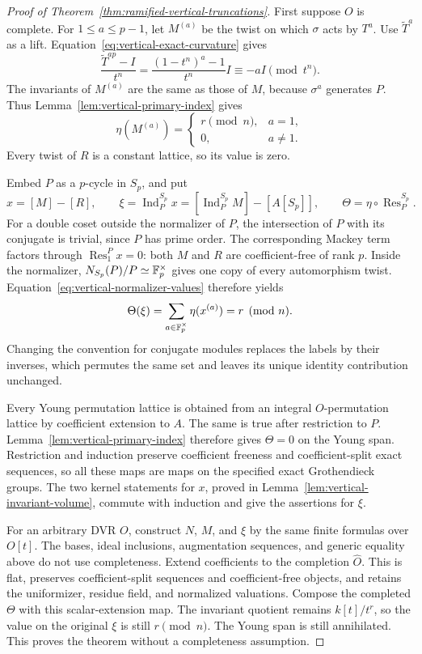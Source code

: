 \begin{proof}[Proof of Theorem~\ref{thm:ramified-vertical-truncations}]
First suppose \(O\) is complete.
For \(1\le a\le p-1\), let \(M^{(a)}\) be the twist on which
\(\sigma\) acts by \(T^a\).  Use \(\widetilde T^a\) as a lift.
Equation~\eqref{eq:vertical-exact-curvature} gives
\[
 \frac{\widetilde T^{ap}-I}{t^n}
 =\frac{(1-t^n)^a-1}{t^n}I
 \equiv -aI\pmod{t^n}.
\]
The invariants of \(M^{(a)}\) are the same as those of \(M\),
because \(\sigma^a\) generates \(P\).  Thus
Lemma~\ref{lem:vertical-primary-index} gives
\begin{equation}\label{eq:vertical-normalizer-values}
 \eta(M^{(a)})=
 \begin{cases}
 r\pmod n,&a=1,\\
 0,&a\ne1.
 \end{cases}
\end{equation}
Every twist of \(R\) is a constant lattice, so its value is zero.

Embed \(P\) as a \(p\)-cycle in \(S_p\), and put
\[
 x=[M]-[R],\qquad
 \xi=\operatorname{Ind}_{P}^{S_p}x
     =[\operatorname{Ind}_{P}^{S_p}M]-[A[S_p]],
 \qquad
 \Theta=\eta\circ\operatorname{Res}_{P}^{S_p}.
\]
For a double coset outside the normalizer of \(P\), the
intersection of \(P\) with its conjugate is trivial, since
\(P\) has prime order.
The corresponding Mackey term factors through
\(\operatorname{Res}_{1}^{P}x=0\): both \(M\) and \(R\)
are coefficient-free of rank \(p\).
Inside the normalizer, \(N_{S_p}(P)/P\simeq\mathbb F_p^\times\)
gives one copy of every automorphism twist.
Equation~\eqref{eq:vertical-normalizer-values} therefore yields
\[
 \Theta(\xi)=
 \sum_{a\in\mathbb F_p^\times}\eta(x^{(a)})
 =r\pmod n.
\]
Changing the convention for conjugate modules replaces the
labels by their inverses, which permutes the same set and
leaves its unique identity contribution unchanged.

Every Young permutation lattice is obtained from an integral
\(O\)-permutation lattice by coefficient extension to \(A\).
The same is true after restriction to \(P\).
Lemma~\ref{lem:vertical-primary-index} therefore gives
\(\Theta=0\) on the Young span.
Restriction and induction preserve coefficient freeness and
coefficient-split exact sequences, so all these maps are maps
on the specified exact Grothendieck groups.
The two kernel statements for \(x\), proved in
Lemma~\ref{lem:vertical-invariant-volume}, commute with
induction and give the assertions for \(\xi\).

For an arbitrary DVR \(O\), construct \(N\), \(M\), and \(\xi\)
by the same finite formulas over \(O[t]\).
The bases, ideal inclusions, augmentation sequences, and
generic equality above do not use completeness.
Extend coefficients to the completion \(\widehat O\).
This is flat, preserves coefficient-split sequences and
coefficient-free objects, and retains the uniformizer,
residue field, and normalized valuations.
Compose the completed \(\Theta\) with this scalar-extension
map.  The invariant quotient remains \(k[t]/t^r\), so the
value on the original \(\xi\) is still \(r\pmod n\).
The Young span is still annihilated.
This proves the theorem without a completeness assumption.
\end{proof}

